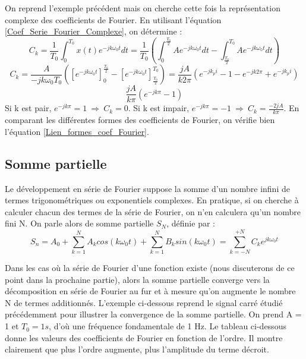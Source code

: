 	On reprend l'exemple précédent mais on cherche cette fois la représentation complexe des coefficients de Fourier. En utilisant l'équation \ref{Coef_Serie_Fourier_Complexe}, on détermine :
	\begin{equation*}
	C_{k}=\frac{1}{T_{0}}\int_{0}^{T_{0}}x(t)e^{-jk\omega_{0}t}dt=\frac{1}{T_{0}}(\int_{0}^{\frac{T_{0}}{2}}Ae^{-jk\omega_{0}t}dt-\int_{\frac{T_{0}}{2}}^{T_{0}}Ae^{-jk\omega_{0}t}dt)
	\end{equation*} 
	\begin{equation*}
	C_{k}=\frac{A}{-jk\omega_{0}T_{0}}([e^{-jk\omega_{0}t}]_{0}^{\frac{T_{0}}{2}}-[e^{-jk\omega_{0}t}]_{\frac{T_{0}}{2}}^{T_{0}})=\frac{jA}{k2\pi}(e^{-jk_pi}-1-e^{-jk2\pi}+e^{-jk_pi})
	\end{equation*}
	\begin{equation*}
	\frac{jA}{k\pi}(e^{-jk\pi}-1)
	\end{equation*}
	Si k est pair, $e^{-jk\pi}=1~\Rightarrow~C_{k}=0$. Si k est impair,  $e^{-jk\pi}=-1~\Rightarrow~C_{k}=\frac{-2jA}{k\pi}$. En comparant les différentes formes des coefficients de Fourier, on vérifie bien l'équation \ref{Lien_formes_coef_Fourier}.
	
	
	\subsection{Somme partielle}
		
	Le développement en série de Fourier suppose la somme d'un nombre infini de termes trigonométriques ou exponentiels complexes. En pratique, si on cherche à calculer chacun des termes de la série de Fourier, on n'en calculera qu'un nombre fini N. On parle alors de somme partielle $S_{N}$, définie par :
	\begin{equation}\label{Somme_partielle}
	S_{n}=A_{0}+\sum_{k=1}^{N}A_{k}cos(k\omega_{0}t)+\sum_{k=1}^{N}B_{k}sin(k\omega_{0}t)=\sum_{k=-N}^{+N}C_{k}e^{jk\omega_{0}t}
	\end{equation}
	
	Dans les cas où la série de Fourier d'une fonction existe (nous discuterons de ce point dans la prochaine partie), alors la somme partielle converge vers la décomposition en série de Fourier au fur et à mesure qu'on augmente le nombre N de termes additionnés.
	L'exemple ci-dessous reprend le signal carré étudié précédemment pour illustrer la convergence de la somme partielle. On prend A = 1 et $T_{0} = 1 s$, d'où une fréquence fondamentale de 1 Hz. Le tableau ci-dessous donne les valeurs des coefficients de Fourier en fonction de l'ordre. Il montre clairement que plus l'ordre augmente, plus l'amplitude du terme décroit.
	
